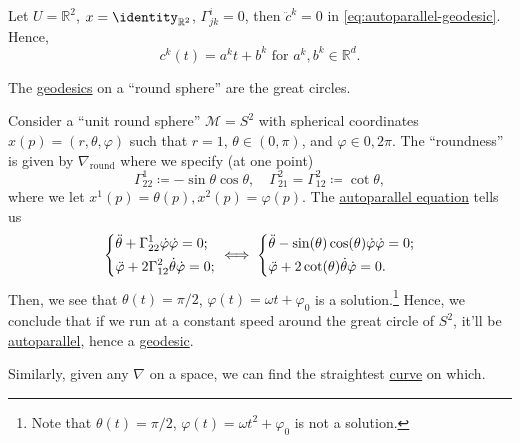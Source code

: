 \begin{eg}
	Let \(U = \mathbb{R} ^2\), \(x = \identity_{\mathbb{R} ^2} \), \(\Gamma ^i_{jk} = 0\), then \(\ddot{c} ^k = 0 \) in \autoref{eq:autoparallel-geodesic}. Hence,
	\[
		c^k (t) = a^k t + b^k \text{ for } a^k, b^k\in \mathbb{R} ^d.
	\]
\end{eg}

\begin{eg}
	The \hyperref[def:geodesic]{geodesics} on a ``round sphere'' are the great circles.
\end{eg}
\begin{explanation}
	Consider a ``unit round sphere'' \(\mathcal{M} = S^2\) with spherical coordinates \(x(p) = (r, \theta , \varphi )\) such that \(r=1\), \(\theta \in(0, \pi )\), and \(\varphi \in 0, 2\pi \). The ``roundness'' is given by \(\nabla _{\text{round}}\) where we specify (at one point)
	\[
		\Gamma^1_{22} \coloneqq - \sin \theta \cos \theta ,\quad
		\Gamma^2_{21} = \Gamma^2_{12} \coloneqq \cot \theta,
	\]
	where we let \(x^1(p) = \theta (p), x^2(p) = \varphi (p)\). The \hyperref[def:autoparallel]{autoparallel equation} tells us
	\[
		\begin{dcases}
			\ddot{\theta } + \Gamma ^1_{22} \dot{\varphi } \dot{\varphi } = 0; \\
			\ddot{\varphi } + 2\Gamma ^2_{12} \dot{\theta } \dot{\varphi } = 0;
		\end{dcases}
		\iff \begin{dcases}
			\ddot{\theta } - \sin (\theta) \cos (\theta) \dot{\varphi } \dot{\varphi } = 0; \\
			\ddot{\varphi } + 2 \cot (\theta) \dot{\theta } \dot{\varphi } = 0.
		\end{dcases}
	\]
	Then, we see that \(\theta (t) = \pi / 2\), \(\varphi (t) = \omega t + \varphi _0\) is a solution.\footnote{Note that \(\theta (t) = \pi / 2\), \(\varphi (t) = \omega t^2 + \varphi _0\) is not a solution.} Hence, we conclude that if we run at a constant speed around the great circle of \(S^2\), it'll be \hyperref[def:autoparallel]{autoparallel}, hence a \hyperref[def:geodesic]{geodesic}.
\end{explanation}

Similarly, given any \(\nabla \) on a space, we can find the straightest \hyperref[def:curve]{curve} on which.